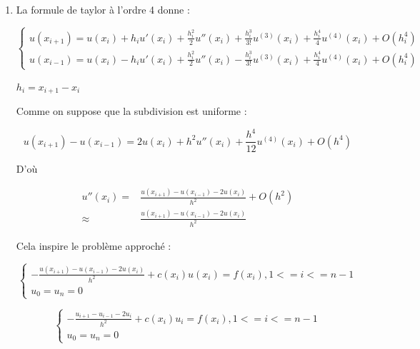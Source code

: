 \documentclass[12pt, letterpaper]{article}
\begin{document}
\begin{enumerate}
\item La formule de taylor à l'ordre 4 donne :

  \begin{equation*}
    \left\{
    \begin{array}{l}
      u(x_{i+1}) = u(x_i) + h_i u'(x_i) + \frac{h_i^2}{2} u''(x_i) +
      \frac{h_i^3}{3!} u^{(3)}(x_i) + \frac{h_i^4}{4} u^{(4)}(x_i) +
      O(h_i^4) \\
      u(x_{i-1}) = u(x_i) - h_i u'(x_i) + \frac{h_i^2}{2} u''(x_i) -
      \frac{h_i^3}{3!} u^{(3)}(x_i) + \frac{h_i^4}{4} u^{(4)}(x_i) + O(h_i^4)
    \end{array}
    \right.
  \end{equation*}

  $h_i = x_{i+1} - x_i$

  Comme on suppose que la subdivision est uniforme :

  \begin{equation*}
      u(x_{i+1}) - u(x_{i-1}) = 2 u(x_i) + h^2 u''(x_i) + \frac{h^4}{12}
      u^{(4)}(x_i) + O(h^4)
  \end{equation*}

  D'où

  \begin{equation*}
    \begin{split}
      u''(x_i) = & \frac{u(x_{i+1}) - u(x_{i-1}) - 2 u(x_i)}{h^2} +
      O(h^2) \\
      \approx & \frac{u(x_{i+1}) - u(x_{i-1}) - 2 u(x_i)}{h^2}
    \end{split}
  \end{equation*}

  Cela inspire le problème approché :

  \begin{equation*}
    \left\{
    \begin{array}{l}
      - \frac{u(x_{i+1}) - u(x_{i-1}) - 2 u(x_i)}{h^2} + c(x_i) u(x_i) =
      f(x_i), 1 <= i <= n-1 \\
      u_0 = u_n = 0
    \end{array}
    \right.
  \end{equation*}

  \begin{equation*}
    \left\{
    \begin{array}{l}
      - \frac{u_{i+1} - u_{i-1} - 2 u_i}{h^2} + c(x_i) u_i =
      f(x_i), 1 <= i <= n-1 \\
      u_0 = u_n = 0
    \end{array}
    \right.
  \end{equation*}



\end{enumerate}
\end{document}
